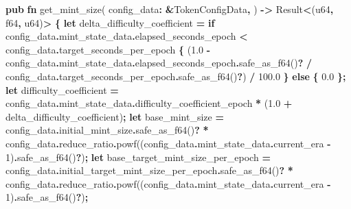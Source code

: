 \documentclass[
]{article}
\newenvironment{Shaded}{\begin{snugshade}}{\end{snugshade}}
\newcommand{\ControlFlowTok}[1]{\textcolor[rgb]{0.13,0.29,0.53}{\textbf{#1}}}
\newcommand{\DataTypeTok}[1]{\textcolor[rgb]{0.13,0.29,0.53}{#1}}
\newcommand{\DecValTok}[1]{\textcolor[rgb]{0.00,0.00,0.81}{#1}}
\newcommand{\KeywordTok}[1]{\textcolor[rgb]{0.13,0.29,0.53}{\textbf{#1}}}
\newcommand{\NormalTok}[1]{#1}
\newcommand{\OperatorTok}[1]{\textcolor[rgb]{0.81,0.36,0.00}{\textbf{#1}}}
\begin{document}
\begin{Shaded}
\begin{Highlighting}[numbers=left,,]
\KeywordTok{pub} \KeywordTok{fn}\NormalTok{ get\_mint\_size(}
\NormalTok{  config\_data}\OperatorTok{:} \OperatorTok{\&}\NormalTok{TokenConfigData}\OperatorTok{,}
\NormalTok{) }\OperatorTok{{-}\textgreater{}} \DataTypeTok{Result}\OperatorTok{\textless{}}\NormalTok{(}\DataTypeTok{u64}\OperatorTok{,} \DataTypeTok{f64}\OperatorTok{,} \DataTypeTok{u64}\NormalTok{)}\OperatorTok{\textgreater{}} \OperatorTok{\{}
  \KeywordTok{let}\NormalTok{ delta\_difficulty\_coefficient }\OperatorTok{=} \ControlFlowTok{if}\NormalTok{ config\_data}\OperatorTok{.}\NormalTok{mint\_state\_data}\OperatorTok{.}\NormalTok{elapsed\_seconds\_epoch}
    \OperatorTok{\textless{}}\NormalTok{ config\_data}\OperatorTok{.}\NormalTok{target\_seconds\_per\_epoch }\OperatorTok{\{}
\NormalTok{    (}\DecValTok{1.0} \OperatorTok{{-}}\NormalTok{ config\_data}\OperatorTok{.}\NormalTok{mint\_state\_data}\OperatorTok{.}\NormalTok{elapsed\_seconds\_epoch}\OperatorTok{.}\NormalTok{safe\_as\_f64()}\OperatorTok{?} \OperatorTok{/} 
\NormalTok{       config\_data}\OperatorTok{.}\NormalTok{target\_seconds\_per\_epoch}\OperatorTok{.}\NormalTok{safe\_as\_f64()}\OperatorTok{?}\NormalTok{) }\OperatorTok{/} \DecValTok{100.0}
  \OperatorTok{\}} \ControlFlowTok{else} \OperatorTok{\{}
    \DecValTok{0.0}
  \OperatorTok{\};}
  \KeywordTok{let}\NormalTok{ difficulty\_coefficient }\OperatorTok{=}\NormalTok{ config\_data}\OperatorTok{.}\NormalTok{mint\_state\_data}\OperatorTok{.}\NormalTok{difficulty\_coefficient\_epoch }
    \OperatorTok{*}\NormalTok{ (}\DecValTok{1.0} \OperatorTok{+}\NormalTok{ delta\_difficulty\_coefficient)}\OperatorTok{;}
  \KeywordTok{let}\NormalTok{ base\_mint\_size }\OperatorTok{=}\NormalTok{ config\_data}\OperatorTok{.}\NormalTok{initial\_mint\_size}\OperatorTok{.}\NormalTok{safe\_as\_f64()}\OperatorTok{?} 
    \OperatorTok{*}\NormalTok{ config\_data}\OperatorTok{.}\NormalTok{reduce\_ratio}\OperatorTok{.}\NormalTok{powf((config\_data}\OperatorTok{.}\NormalTok{mint\_state\_data}\OperatorTok{.}\NormalTok{current\_era }\OperatorTok{{-}} \DecValTok{1}\NormalTok{)}\OperatorTok{.}\NormalTok{safe\_as\_f64()}\OperatorTok{?}\NormalTok{)}\OperatorTok{;}
  \KeywordTok{let}\NormalTok{ base\_target\_mint\_size\_per\_epoch }\OperatorTok{=}\NormalTok{ config\_data}\OperatorTok{.}\NormalTok{initial\_target\_mint\_size\_per\_epoch}\OperatorTok{.}\NormalTok{safe\_as\_f64()}\OperatorTok{?} 
    \OperatorTok{*}\NormalTok{ config\_data}\OperatorTok{.}\NormalTok{reduce\_ratio}\OperatorTok{.}\NormalTok{powf((config\_data}\OperatorTok{.}\NormalTok{mint\_state\_data}\OperatorTok{.}\NormalTok{current\_era }\OperatorTok{{-}} \DecValTok{1}\NormalTok{)}\OperatorTok{.}\NormalTok{safe\_as\_f64()}\OperatorTok{?}\NormalTok{)}\OperatorTok{;}

\end{Highlighting}
\end{Shaded}
\end{document}

